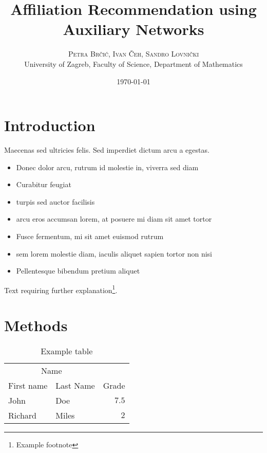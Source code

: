\documentclass[twoside,twocolumn]{article}
\title{Affiliation Recommendation using Auxiliary Networks} %
\author{%
\textsc{Petra Brčić, Ivan Čeh, Sandro Lovnički}\\[1ex]%
\normalsize University of Zagreb, Faculty of Science, Department of Mathematics \\ %
}
\date{\today} %
\begin{document}
\maketitle


\section{Introduction}

\blindtext %

Maecenas sed ultricies felis. Sed imperdiet dictum arcu a egestas. 
\begin{itemize}
\item Donec dolor arcu, rutrum id molestie in, viverra sed diam
\item Curabitur feugiat
\item turpis sed auctor facilisis
\item arcu eros accumsan lorem, at posuere mi diam sit amet tortor
\item Fusce fermentum, mi sit amet euismod rutrum
\item sem lorem molestie diam, iaculis aliquet sapien tortor non nisi
\item Pellentesque bibendum pretium aliquet
\end{itemize}
\blindtext %

Text requiring further explanation\footnote{Example footnote}.


\section{Methods}

\begin{table}
\caption{Example table}
\centering
\begin{tabular}{llr}
\toprule
\multicolumn{2}{c}{Name} \\
\cmidrule(r){1-2}
First name & Last Name & Grade \\
\midrule
John & Doe & $7.5$ \\
Richard & Miles & $2$ \\
\bottomrule
\end{tabular}
\end{table}
\end{document}
